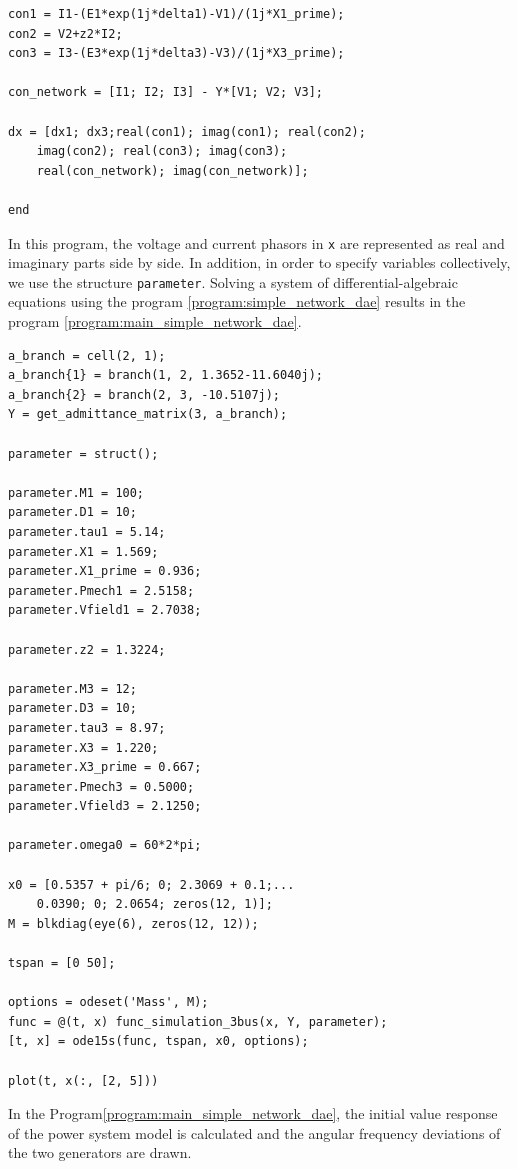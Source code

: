 \documentclass[tombow,dvipdfmx]{corona-a5-1.1}
\begin{document}
\begin{例}
\begin{PROGRAMA}[count,title={func\_simulation\_3bus.m}]
\begin{verbatim}
con1 = I1-(E1*exp(1j*delta1)-V1)/(1j*X1_prime);
con2 = V2+z2*I2;
con3 = I3-(E3*exp(1j*delta3)-V3)/(1j*X3_prime);

con_network = [I1; I2; I3] - Y*[V1; V2; V3];

dx = [dx1; dx3;real(con1); imag(con1); real(con2);
    imag(con2); real(con3); imag(con3);
    real(con_network); imag(con_network)];

end
\end{verbatim}
\end{PROGRAMA}

In this program, the voltage and current phasors in \verb|x| are represented as real and imaginary parts side by side.
In addition, in order to specify variables collectively, we use the structure \verb|parameter|.
Solving a system of differential-algebraic equations using the program \ref{program:simple_network_dae} results in the program \nobreak\ref{program:main_simple_network_dae}.

\smallskip
\begin{PROGRAMA}[count,title={main\_simulation\_simple.m}]\label{program:main_simple_network_dae}
\begin{verbatim}
a_branch = cell(2, 1);
a_branch{1} = branch(1, 2, 1.3652-11.6040j);
a_branch{2} = branch(2, 3, -10.5107j);
Y = get_admittance_matrix(3, a_branch);

parameter = struct();

parameter.M1 = 100;
parameter.D1 = 10;
parameter.tau1 = 5.14;
parameter.X1 = 1.569;
parameter.X1_prime = 0.936;
parameter.Pmech1 = 2.5158;
parameter.Vfield1 = 2.7038;

parameter.z2 = 1.3224;

parameter.M3 = 12;
parameter.D3 = 10;
parameter.tau3 = 8.97;
parameter.X3 = 1.220;
parameter.X3_prime = 0.667;
parameter.Pmech3 = 0.5000;
parameter.Vfield3 = 2.1250;

parameter.omega0 = 60*2*pi;

x0 = [0.5357 + pi/6; 0; 2.3069 + 0.1;...
    0.0390; 0; 2.0654; zeros(12, 1)];
M = blkdiag(eye(6), zeros(12, 12));

tspan = [0 50];

options = odeset('Mass', M);
func = @(t, x) func_simulation_3bus(x, Y, parameter);
[t, x] = ode15s(func, tspan, x0, options); 

plot(t, x(:, [2, 5]))
\end{verbatim}
\end{PROGRAMA}

In the Program\nobreak\ref{program:main_simple_network_dae},
the initial value response of the power system model is calculated and the angular frequency deviations of the two generators are drawn.
\end{例}
\end{document}
